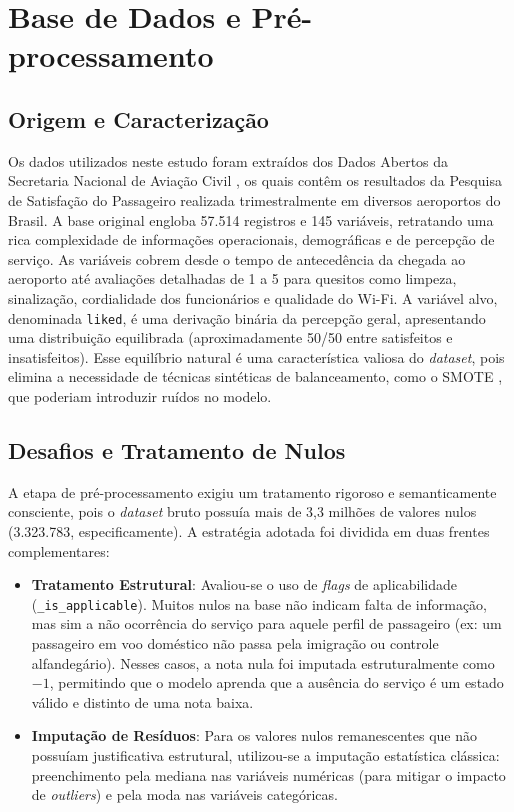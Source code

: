 \documentclass[12pt]{article}
\begin{document}
\section{Base de Dados e Pré-processamento}

\subsection{Origem e Caracterização}
Os dados utilizados neste estudo foram extraídos dos Dados Abertos da Secretaria Nacional de Aviação Civil \cite{snac_dados}, os quais contêm os resultados da Pesquisa de Satisfação do Passageiro realizada trimestralmente em diversos aeroportos do Brasil. A base original engloba 57.514 registros e 145 variáveis, retratando uma rica complexidade de informações operacionais, demográficas e de percepção de serviço. As variáveis cobrem desde o tempo de antecedência da chegada ao aeroporto até avaliações detalhadas de 1 a 5 para quesitos como limpeza, sinalização, cordialidade dos funcionários e qualidade do Wi-Fi. A variável alvo, denominada \texttt{liked}, é uma derivação binária da percepção geral, apresentando uma distribuição equilibrada (aproximadamente 50/50 entre satisfeitos e insatisfeitos). Esse equilíbrio natural é uma característica valiosa do \textit{dataset}, pois elimina a necessidade de técnicas sintéticas de balanceamento, como o SMOTE \cite{chawla2002smote}, que poderiam introduzir ruídos no modelo.

\subsection{Desafios e Tratamento de Nulos}
A etapa de pré-processamento exigiu um tratamento rigoroso e semanticamente consciente, pois o \textit{dataset} bruto possuía mais de 3,3 milhões de valores nulos (3.323.783, especificamente). A estratégia adotada foi dividida em duas frentes complementares:
\begin{itemize}
    \item \textbf{Tratamento Estrutural}: Avaliou-se o uso de \textit{flags} de aplicabilidade (\texttt{\_is\_applicable}). Muitos nulos na base não indicam falta de informação, mas sim a não ocorrência do serviço para aquele perfil de passageiro (ex: um passageiro em voo doméstico não passa pela imigração ou controle alfandegário). Nesses casos, a nota nula foi imputada estruturalmente como $-1$, permitindo que o modelo aprenda que a ausência do serviço é um estado válido e distinto de uma nota baixa.
    \item \textbf{Imputação de Resíduos}: Para os valores nulos remanescentes que não possuíam justificativa estrutural, utilizou-se a imputação estatística clássica: preenchimento pela mediana nas variáveis numéricas (para mitigar o impacto de \textit{outliers}) e pela moda nas variáveis categóricas.
\end{itemize}
\end{document}
